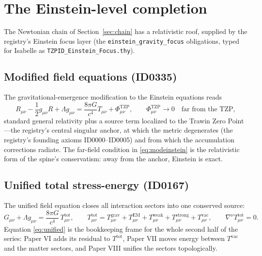 \documentclass[11pt]{article}
\theoremstyle{remark}
\begin{document}
\section{The Einstein-level completion}
\label{sec:einstein}

The Newtonian chain of Section~\ref{sec:chain} has a relativistic roof, supplied by the registry's Einstein focus layer (the \texttt{einstein\_gravity\_focus} obligations, typed for Isabelle as \texttt{TZPID\_Einstein\_Focus.thy}).

\subsection{Modified field equations (ID0335)}

The gravitational-emergence modification to the Einstein equations reads
\begin{equation}
R_{\mu\nu} - \frac{1}{2} g_{\mu\nu} R + \Lambda g_{\mu\nu} = \frac{8\pi G}{c^4} T_{\mu\nu} + \Phi^{\mathrm{TZP}}_{\mu\nu},
\qquad \Phi^{\mathrm{TZP}}_{\mu\nu} \to 0 \quad \text{far from the TZP},
\label{eq:modeinstein}
\end{equation}
standard general relativity plus a source term localized to the Trawin Zero Point---the registry's central singular anchor, at which the metric degenerates (the registry's founding axioms ID0000--ID0005) and from which the accumulation corrections radiate. The far-field condition in \eqref{eq:modeinstein} is the relativistic form of the spine's conservatism: away from the anchor, Einstein is exact.

\subsection{Unified total stress-energy (ID0167)}

The unified field equation closes all interaction sectors into one conserved source:
\begin{equation}
G_{\mu\nu} + \Lambda g_{\mu\nu} = \frac{8\pi G}{c^4}\, T^{\mathrm{tot}}_{\mu\nu}, \qquad
T^{\mathrm{tot}}_{\mu\nu} = T^{\mathrm{grav}}_{\mu\nu} + T^{\mathrm{EM}}_{\mu\nu} + T^{\mathrm{weak}}_{\mu\nu} + T^{\mathrm{strong}}_{\mu\nu} + T^{\mathrm{vac}}_{\mu\nu}, \qquad
\nabla^\nu T^{\mathrm{tot}}_{\mu\nu} = 0.
\label{eq:unified}
\end{equation}
Equation \eqref{eq:unified} is the bookkeeping frame for the whole second half of the series: Paper VI adds its residual to $T^{\mathrm{tot}}$, Paper VII moves energy between $T^{\mathrm{vac}}$ and the matter sectors, and Paper VIII unifies the sectors topologically.
\end{document}
